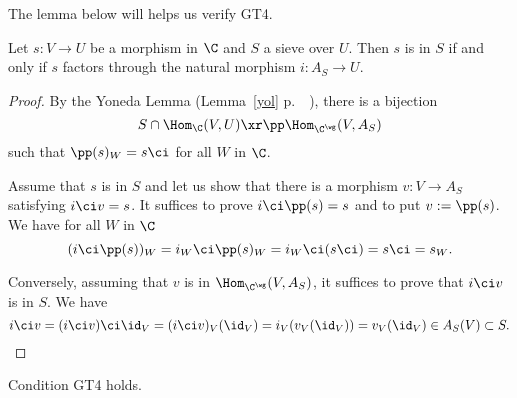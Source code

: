 \documentclass[12pt]{article}
\theoremstyle{remark}
\theoremstyle{definition}
\begin{document}
The lemma below will helps us verify GT4. 

\begin{lem}
Let $s:V\to U$ be a morphism in $\C$ and $S$ a sieve over $U$. Then $s$ is in $S$ if and only if $s$ factors through the natural morphism $i:A_S\to U$.
\end{lem}

\begin{proof}
By the Yoneda Lemma (Lemma~\ref{yol} p.~~), there is a bijection 
$$
S\cap\Hom_\C(V,U)\xr\pp\Hom_{\C^\wg}(V,A_S)
$$
such that $\pp(s)_W=s\ci$ for all $W$ in $\C$. 

Assume that $s$ is in $S$ and let us show that there is a morphism $v:V\to A_S$ satisfying $i\ci v=s$. It suffices to prove $i\ci\pp(s)=s$ and to put $v:=\pp(s)$. We have for all $W$ in $\C$
$$
(i\ci\pp(s))_W=i_W\ci\pp(s)_W=i_W\ci(s\ci)=s\ci=s_W.
$$ 

Conversely, assuming that $v$ is in $\Hom_{\C^\wg}(V,A_S)$, it suffices to prove that $i\ci v$ is in $S$. We have 
$$
i\ci v=(i\ci v)\ci\id_V=(i\ci v)_V(\id_V)=i_V(v_V(\id_V))=v_V(\id_V)\in A_S(V)\subset S. 
$$ 
\end{proof} 

\begin{lem}
Condition GT4 holds.
\end{lem}
\end{document}
